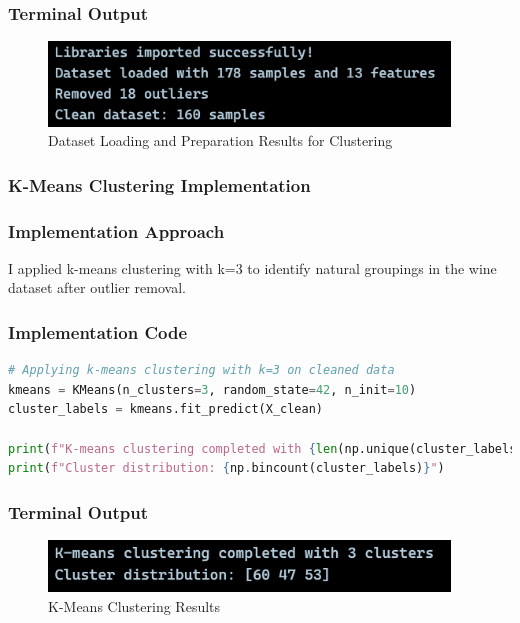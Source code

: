 \documentclass[12pt,a4paper]{article}
\begin{document}
\subsubsection{Terminal Output}
\begin{figure}[h!]
\centering
    \includegraphics[width=0.95\textwidth]{Figures/clustering_loading.png}
    \caption{Dataset Loading and Preparation Results for Clustering}
\end{figure}

\subsubsection{K-Means Clustering Implementation}

\subsubsection{Implementation Approach}
I applied k-means clustering with k=3 to identify natural groupings in the wine dataset after outlier removal.

\subsubsection{Implementation Code}
\begin{lstlisting}[language=Python, caption=K-Means Clustering Implementation]
# Applying k-means clustering with k=3 on cleaned data
kmeans = KMeans(n_clusters=3, random_state=42, n_init=10)
cluster_labels = kmeans.fit_predict(X_clean)

print(f"K-means clustering completed with {len(np.unique(cluster_labels))} clusters")
print(f"Cluster distribution: {np.bincount(cluster_labels)}")
\end{lstlisting}

\newpage
\subsubsection{Terminal Output}
\begin{figure}[h!]
\centering
    \includegraphics[width=0.95\textwidth]{Figures/kmeans_results.png}
    \caption{K-Means Clustering Results}
\end{figure}
\end{document}
